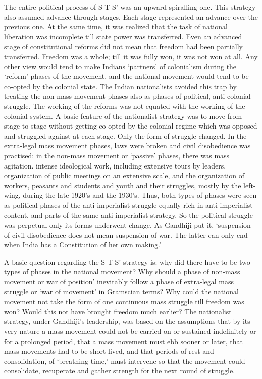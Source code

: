 \begin{multicols}{2}
The entire political process of S-T-S' was an upward spiralling one. This strategy also assumed advance through stages. Each stage represented an advance over the previous one. At the same time, it was realized that the task of national liberation was incomplete till state power was transferred. Even an advanced stage of constitutional reforms did not mean that freedom had been partially transferred. Freedom was a whole; till it was fully won, it was not won at all. Any other view would tend to make Indians `partners' of colonialism during the `reform' phases of the movement, and the national movement would tend to be co-opted by the colonial state. The Indian nationalists avoided this trap by treating the non-mass movement phases also as phases of political, anti-colonial struggle. The working of the reforms was not equated with the working of the colonial system. A basic feature of the nationalist strategy was to move from stage to stage without getting co-opted by the colonial regime which was opposed and struggled against at each stage. Only the form of struggle changed. In the extra-legal mass movement phases, laws were broken and civil disobedience was practised: in the non-mass movement or `passive' phases, there was mass agitation. intense ideological work, including extensive tours by leaders, organization of public meetings on an extensive scale, and the organization of workers, peasants and students and youth and their struggles, mostly by the left-wing, during the late 1920's and the 1930's. Thus, both types of phases were seen as political phases of the anti-imperialist struggle equally rich in anti-imperialist content, and parts of the same anti-imperialist strategy. So the political struggle was perpetual only its forms underwent change. As Gandhiji put it, `suspension of civil disobedience does not mean suspension of war. The latter can only end when India has a Constitution of her own making.'

A basic question regarding the S-T-S' strategy is: why did there have to be two types of phases in the national movement? Why should a phase of non-mass movement or war of position' inevitably follow a phase of extra-legal mass struggle or `war of movement' in Gramscian terms? Why could the national movement not take the form of one continuous mass struggle till freedom was won? Would this not have brought freedom much earlier? The nationalist strategy, under Gandhiji's leadership, was based on the assumptions that by its very nature a mass movement could not be carried on or sustained indefinitely or for a prolonged period, that a mass movement must ebb sooner or later, that mass movements had to be short lived, and that periods of rest and consolidation, of `breathing time,' must intervene so that the movement could consolidate, recuperate and gather strength for the next round of struggle.


\end{multicols}
